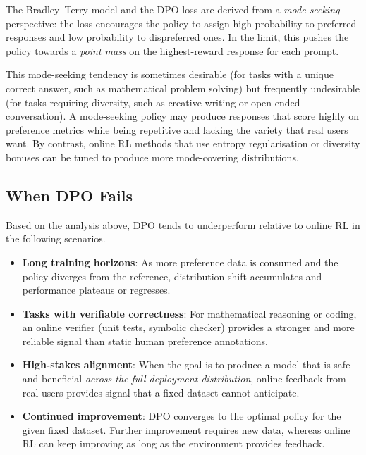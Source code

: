 The Bradley--Terry model and the DPO loss are derived from a \emph{mode-seeking} perspective: the loss encourages the policy to assign high probability to preferred responses and low probability to dispreferred ones. In the limit, this pushes the policy towards a \emph{point mass} on the highest-reward response for each prompt.

This mode-seeking tendency is sometimes desirable (for tasks with a unique correct answer, such as mathematical problem solving) but frequently undesirable (for tasks requiring diversity, such as creative writing or open-ended conversation). A mode-seeking policy may produce responses that score highly on preference metrics while being repetitive and lacking the variety that real users want. By contrast, online RL methods that use entropy regularisation or diversity bonuses can be tuned to produce more mode-covering distributions.

\subsection{When DPO Fails}

Based on the analysis above, DPO tends to underperform relative to online RL in the following scenarios.

\begin{itemize}[leftmargin=*]
  \item \textbf{Long training horizons}: As more preference data is consumed and the policy diverges from the reference, distribution shift accumulates and performance plateaus or regresses.
  \item \textbf{Tasks with verifiable correctness}: For mathematical reasoning or coding, an online verifier (unit tests, symbolic checker) provides a stronger and more reliable signal than static human preference annotations.
  \item \textbf{High-stakes alignment}: When the goal is to produce a model that is safe and beneficial \emph{across the full deployment distribution}, online feedback from real users provides signal that a fixed dataset cannot anticipate.
  \item \textbf{Continued improvement}: DPO converges to the optimal policy for the given fixed dataset. Further improvement requires new data, whereas online RL can keep improving as long as the environment provides feedback.
\end{itemize}

